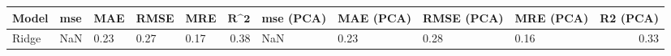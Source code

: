 \begin{table}
\centering
\label{table:iri_reg_pred}
\begin{tabular}{lllllrllllr}
\toprule
\textbf{Model} & \textbf{mse} & \textbf{MAE} & \textbf{RMSE} & \textbf{MRE} & $\textbf{R^2}$ & \textbf{mse (PCA)} & \textbf{MAE (PCA)} & \textbf{RMSE (PCA)} & \textbf{MRE (PCA)} & \textbf{R2 (PCA)} \\
\midrule
         Ridge &          NaN &         0.23 &          0.27 &         0.17 &           0.38 &                NaN &               0.23 &                0.28 &               0.16 &              0.33 \\
\bottomrule
\end{tabular}
\end{table}
